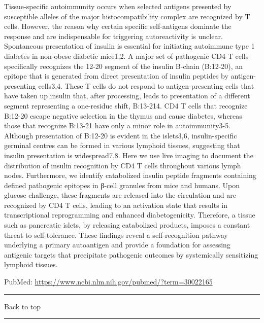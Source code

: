 \documentclass[]{article}
\begin{document}
Tissue-specific autoimmunity occurs when selected antigens presented by
susceptible alleles of the major histocompatibility complex are
recognized by T cells. However, the reason why certain specific
self-antigens dominate the response and are indispensable for triggering
autoreactivity is unclear. Spontaneous presentation of insulin is
essential for initiating autoimmune type 1 diabetes in non-obese
diabetic mice1,2. A major set of pathogenic CD4 T cells specifically
recognizes the 12-20 segment of the insulin B-chain (B:12-20), an
epitope that is generated from direct presentation of insulin peptides
by antigen-presenting cells3,4. These T cells do not respond to
antigen-presenting cells that have taken up insulin that, after
processing, leads to presentation of a different segment representing a
one-residue shift, B:13-214. CD4 T cells that recognize B:12-20 escape
negative selection in the thymus and cause diabetes, whereas those that
recognize B:13-21 have only a minor role in autoimmunity3-5. Although
presentation of B:12-20 is evident in the islets3,6, insulin-specific
germinal centres can be formed in various lymphoid tissues, suggesting
that insulin presentation is widespread7,8. Here we use live imaging to
document the distribution of insulin recognition by CD4 T cells
throughout various lymph nodes. Furthermore, we identify catabolized
insulin peptide fragments containing defined pathogenic epitopes in
β-cell granules from mice and humans. Upon glucose challenge, these
fragments are released into the circulation and are recognized by CD4 T
cells, leading to an activation state that results in transcriptional
reprogramming and enhanced diabetogenicity. Therefore, a tissue such as
pancreatic islets, by releasing catabolized products, imposes a constant
threat to self-tolerance. These findings reveal a self-recognition
pathway underlying a primary autoantigen and provide a foundation for
assessing antigenic targets that precipitate pathogenic outcomes by
systemically sensitizing lymphoid tissues.

PubMed: \url{https://www.ncbi.nlm.nih.gov/pubmed/?term=30022165}

{}

{}

\begin{center}\rule{0.5\linewidth}{\linethickness}\end{center}

Back to top

\begin{center}\rule{0.5\linewidth}{\linethickness}\end{center}
\end{document}
